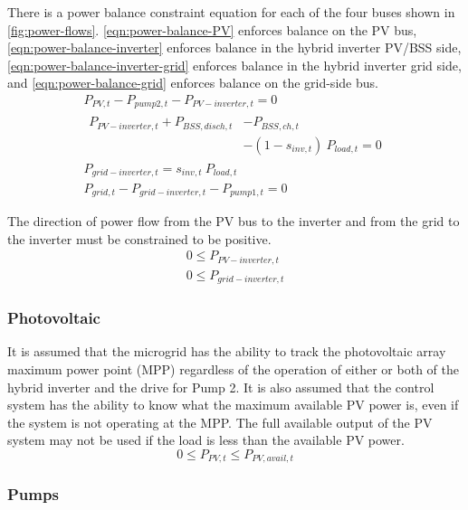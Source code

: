 There is a power balance constraint equation for each of the four buses shown in \autoref{fig:power-flows}. \autoref{eqn:power-balance-PV} enforces balance on the PV bus, \autoref{eqn:power-balance-inverter} enforces balance in the hybrid inverter PV/BSS side, \autoref{eqn:power-balance-inverter-grid} enforces balance in the hybrid inverter grid side, and \autoref{eqn:power-balance-grid} enforces balance on the grid-side bus.
%
\begin{gather}
\label{eqn:power-balance-PV}
P_{PV,t} - P_{pump2,t} - P_{PV-inverter,t} = 0 \\
\label{eqn:power-balance-inverter}
\begin{split}
P_{PV-inverter,t} + P_{BSS,disch,t}& - P_{BSS,ch,t} \\
 &- \left( 1 - s_{inv,t}\right) \ P_{load,t} = 0 
\end{split}
\\
\label{eqn:power-balance-inverter-grid}
P_{grid-inverter,t} = s_{inv,t} \ P_{load,t} \\
\label{eqn:power-balance-grid}
P_{grid,t} - P_{grid-inverter,t} - P_{pump1,t} = 0
\end{gather}

The direction of power flow from the PV bus to the inverter and from the grid to the inverter must be constrained to be positive.
%
\begin{gather}
\label{eqn:pv-inverter-positive}
0 \le P_{PV-inverter,t} \\
\label{eqn:grid-inverter-positive}
0 \le P_{grid-inverter,t}
\end{gather}

\subsubsection{Photovoltaic}

It is assumed that the microgrid has the ability to track the photovoltaic array maximum power point (MPP) regardless of the operation of either or both of the hybrid inverter and the drive for Pump 2. It is also assumed that the control system has the ability to know what the maximum available PV power is, even if the system is not operating at the MPP. The full available output of the PV system may not be used if the load is less than the available PV power.
%
\begin{equation}
\label{eqn:pv-limit}
0 \le P_{PV,t} \le P_{PV,avail,t}
\end{equation}

\subsubsection{Pumps}


